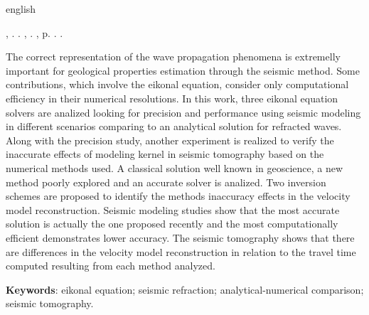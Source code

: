 \begin{resumo}[Abstract]
    \begin{otherlanguage*}{english}

\begin{flushleft}
\MakeUppercase{\imprimirSobrenome}, \imprimirPrimeirosNomes. \textbf{\imprimirTituloEmIngles}. \imprimirtipotrabalhoIngles, \imprimirinstituicaoIngles. \imprimirlocal,  p. \pageref{LastPage}. \imprimirAnoDeDefesa.
\end{flushleft}

        \fonteResumo
        The correct representation of the wave propagation phenomena is extremelly important for geological properties estimation through the seismic method. Some contributions, which involve the eikonal equation, consider only computational efficiency in their numerical resolutions. In this work, three eikonal equation solvers are analized looking for precision and performance using seismic modeling in different scenarios comparing to an analytical solution for refracted waves. Along with the precision study, another experiment is realized to verify the inaccurate effects of modeling kernel in seismic tomography based on the numerical methods used. A classical solution well known in geoscience, a new method poorly explored and an accurate solver is analized. Two inversion schemes are proposed to identify the methods inaccuracy effects in the velocity model reconstruction. Seismic modeling studies show that the most accurate solution is actually the one proposed recently and the most computationally efficient demonstrates lower accuracy. The seismic tomography shows that there are differences in the velocity model reconstruction in relation to the travel time computed resulting from each method analyzed.     
    
        \vspace{\onelineskip}
     
        \noindent 
        \textbf{Keywords}: eikonal equation; seismic refraction; analytical-numerical comparison; seismic tomography.
    \end{otherlanguage*}
\end{resumo}
